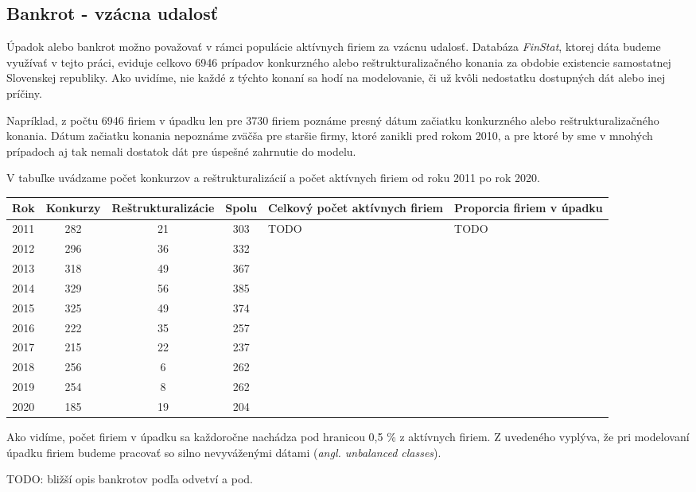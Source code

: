 \subsection{Bankrot - vzácna udalosť}

Úpadok alebo bankrot možno považovať v rámci populácie aktívnych firiem za vzácnu udalosť.
Databáza \emph{FinStat}, ktorej dáta budeme využívať v tejto práci, eviduje celkovo 6946 prípadov konkurzného alebo reštrukturalizačného konania za obdobie existencie samostatnej Slovenskej republiky.
Ako uvidíme, nie každé z týchto konaní sa hodí na modelovanie, či už kvôli nedostatku dostupných dát alebo inej príčiny.

Napríklad, z počtu 6946 firiem v úpadku len pre 3730 firiem poznáme presný dátum začiatku konkurzného alebo reštrukturalizačného konania.
Dátum začiatku konania nepoznáme zväčša pre staršie firmy, ktoré zanikli pred rokom 2010, a pre ktoré by sme v mnohých prípadoch aj tak nemali dostatok dát pre úspešné zahrnutie do modelu.

V tabuľke uvádzame počet konkurzov a reštrukturalizácií a počet aktívnych firiem od roku 2011 po rok 2020.

\begin{center}
    \begin{tabular}{ |c|c|c|c|p{3cm}|p{3cm}| }
        \hline
        Rok & Konkurzy & Reštrukturalizácie & Spolu & Celkový počet aktívnych firiem & Proporcia firiem v úpadku \\
        \hline
        2011 & 282 & 21 & 303 & TODO & TODO \\
        \hline
        2012 & 296 & 36 & 332 & & \\
        \hline
        2013 & 318 & 49 & 367 & & \\
        \hline
        2014 & 329 & 56 & 385 & & \\
        \hline
        2015 & 325 & 49 & 374 & & \\
        \hline
        2016 & 222 & 35 & 257 & & \\
        \hline
        2017 & 215 & 22 & 237 & & \\
        \hline
        2018 & 256 & 6 & 262 & & \\
        \hline
        2019 & 254 & 8 & 262 & & \\
        \hline
        2020 & 185 & 19 & 204 & & \\
        \hline
    \end{tabular}
\end{center}
\bigskip

Ako vidíme, počet firiem v úpadku sa každoročne nachádza pod hranicou 0,5 \% z aktívnych firiem.
Z uvedeného vyplýva, že pri modelovaní úpadku firiem budeme pracovať so silno nevyváženými dátami (\emph{angl. unbalanced classes}).

TODO: bližší opis bankrotov podľa odvetví a pod.